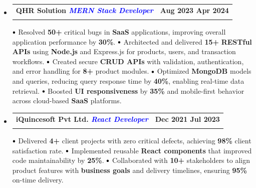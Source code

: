 \documentclass[letterpaper,11pt]{article}
\makeatletter
\newcommand{\resumeSubheading}[4]{
  \vspace{-2pt}\item
    \begin{tabular*}{1.0\textwidth}[t]{l@{\extracolsep{\fill}}r}
      \textbf{\large#1} & \textbf{\small #2} \\
      \textit{\large#3} & \textit{\small #4} \\
      
    \end{tabular*}\vspace{-7pt}
}
\newcommand{\resumeSubHeadingListStart}{\begin{itemize}[leftmargin=0.0in, label={}]}
\newcommand{\resumeSubHeadingListEnd}{\end{itemize}}
\newcommand\sbullet[1][.5]{\mathbin{\vcenter{\hbox{\scalebox{#1}{$\bullet$}}}}}
\makeatother
\begin{document}
\resumeSubHeadingListStart
    \resumeSubheading
        {QHR Solution {\vline\vline} {\textit{\textcolor{blue}{MERN Stack Developer}}}}
        {Aug 2023 \textendash{} Apr 2024}
        {}
        {}
        \vspace{-10pt}
   \begin{itemize}[leftmargin=12.9pt, itemsep=-2.5pt, parsep=0.5pt]
    $\sbullet[.80]$  {\large Resolved \textbf{50+} critical bugs in \textbf{SaaS} applications, improving overall application performance by \textbf{30\%}.\vspace{1.5pt} }
    \newline $\sbullet[.80]$ {\large Architected and delivered \textbf{15+} \textbf{RESTful APIs} using \textbf{Node.js} and Express.js for products, users, and transaction workflows.\vspace{1.5pt}}
    \newline $\sbullet[.80]$ {\large Created secure \textbf{CRUD APIs} with validation, authentication, and error handling for \textbf{8+} product modules.\vspace{1.5pt}}
    \newline $\sbullet[.80]$ {\large Optimized \textbf{MongoDB} models and queries, reducing query response time by \textbf{40\%}, enabling real-time data retrieval.\vspace{1.5pt}}
    \newline $\sbullet[.80]$ {\large Boosted \textbf{UI responsiveness} by \textbf{35\%} and mobile-first behavior across cloud-based \textbf{SaaS} platforms.}
\end{itemize}
\resumeSubHeadingListEnd

\vspace{-10.3pt}

\resumeSubHeadingListStart
    \resumeSubheading
        {iQuincesoft Pvt Ltd. {\vline\vline} {\textit{\textcolor{blue}{React Developer}}}}
        {Dec 2021 \textendash{} Jul 2023}
        {}
        {}
        \vspace{-10pt}
   \begin{itemize}[leftmargin=12.9pt, itemsep=-2.5pt, parsep=0.5pt]
    $\sbullet[.80]$  {\large Delivered \textbf{4+} client projects with zero critical defects, achieving \textbf{98\%} client satisfaction rate.\vspace{1.5pt} }
    \newline $\sbullet[.80]$ {\large Implemented reusable \textbf{React components} that improved code maintainability by \textbf{25\%}.\vspace{1.5pt}}
    \newline $\sbullet[.80]$ {\large Collaborated with \textbf{10+} stakeholders to align product features with \textbf{business goals} and delivery timelines, ensuring \textbf{95\%} on-time delivery.}
\end{itemize}
\resumeSubHeadingListEnd
\end{document}
